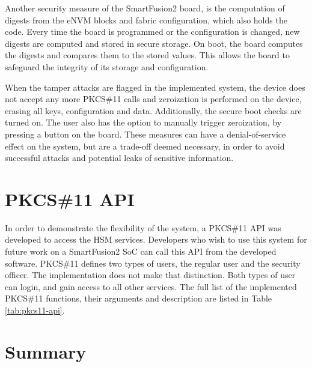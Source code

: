 Another security measure of the SmartFusion2 board, is the computation of digests from the eNVM blocks and fabric configuration, which also holds the code. Every time the board is programmed or the configuration is changed, new digests are computed and stored in secure storage. On boot, the board computes the digests and compares them to the stored values. This allows the board to safeguard the integrity of its storage and configuration.

When the tamper attacks are flagged in the implemented system, the device does not accept any more PKCS\#11 calls and zeroization is performed on the device, erasing all keys, configuration and data. Additionally, the secure boot checks are turned on.
The user also has the option to manually trigger zeroization, by pressing a button on the board.
These measures can have a denial-of-service effect on the system, but are a trade-off deemed necessary, in order to avoid successful attacks and potential leaks of sensitive information.

\section{PKCS\#11 API}\label{chap:implementation:app:pkcs}

In order to demonstrate the flexibility of the system, a PKCS\#11 API was developed to access the HSM services. Developers who wish to use this system for future work on a SmartFusion2 SoC can call this API from the developed software.
PKCS\#11 defines two types of users, the regular user and the security officer. The implementation does not make that distinction. Both types of user can login, and gain access to all other services.
The full list of the implemented PKCS\#11 functions, their arguments and description are listed in Table \ref{tab:pkcs11-api}.

\section*{Summary}\label{chap:implementation:summary}

